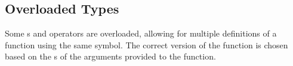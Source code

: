 \subsection{Overloaded Types}\label{subsec:Overloaded_Types}
Some s and operators are overloaded, allowing for multiple definitions of a function using the same symbol.
The correct version of the function is chosen based on the s of the arguments provided to the function.

